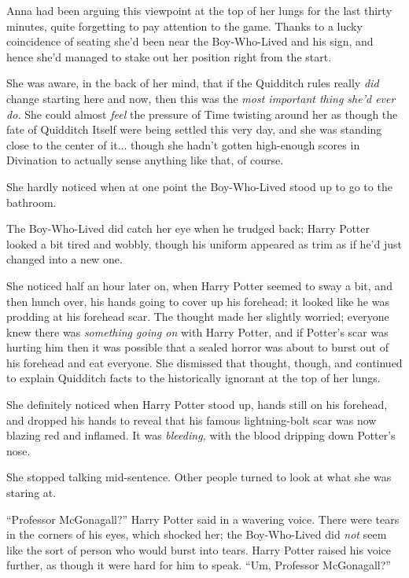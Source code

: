 Anna had been arguing this viewpoint at the top of her lungs for the last thirty minutes, quite forgetting to pay attention to the game. Thanks to a lucky coincidence of seating she'd been near the Boy-Who-Lived and his sign, and hence she'd managed to stake out her position right from the start.

She was aware, in the back of her mind, that if the Quidditch rules really \emph{did} change starting here and now, then this was the \emph{most important thing she'd ever do.} She could almost \emph{feel} the pressure of Time twisting around her as though the fate of Quidditch Itself were being settled this very day, and she was standing close to the center of it... though she hadn't gotten high-enough scores in Divination to actually sense anything like that, of course.

She hardly noticed when at one point the Boy-Who-Lived stood up to go to the bathroom.

The Boy-Who-Lived did catch her eye when he trudged back; Harry Potter looked a bit tired and wobbly, though his uniform appeared as trim as if he'd just changed into a new one.

She noticed half an hour later on, when Harry Potter seemed to sway a bit, and then hunch over, his hands going to cover up his forehead; it looked like he was prodding at his forehead scar. The thought made her slightly worried; everyone knew there was \emph{something going on} with Harry Potter, and if Potter's scar was hurting him then it was possible that a sealed horror was about to burst out of his forehead and eat everyone. She dismissed that thought, though, and continued to explain Quidditch facts to the historically ignorant at the top of her lungs.

She definitely noticed when Harry Potter stood up, hands still on his forehead, and dropped his hands to reveal that his famous lightning-bolt scar was now blazing red and inflamed. It was \emph{bleeding,} with the blood dripping down Potter's nose.

She stopped talking mid-sentence. Other people turned to look at what she was staring at.

``Professor McGonagall?'' Harry Potter said in a wavering voice. There were tears in the corners of his eyes, which shocked her; the Boy-Who-Lived did \emph{not} seem like the sort of person who would burst into tears. Harry Potter raised his voice further, as though it were hard for him to speak. ``Um, Professor McGonagall?''

